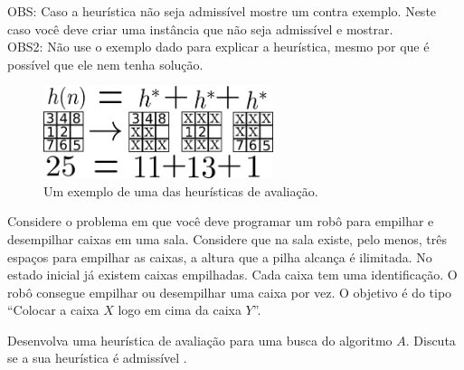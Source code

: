 \documentclass[12pt]{exam}
\begin{document}
\begin{questions}
OBS: Caso a heurística não seja admissível mostre um contra exemplo. Neste caso você deve criar uma instância que não seja admissível e mostrar.\\
OBS2: Não use o exemplo dado para explicar a heurística, mesmo por que é possível que ele nem tenha solução.



\begin{figure}[h]
    \centering
    \includegraphics[width=0.60\textwidth]{8p3heu}
    \caption{Um exemplo de uma das heurísticas de avaliação.}
    \label{fig:8p3heu}
\end{figure}


\question Considere o problema em que você deve programar um robô para empilhar e desempilhar caixas em uma sala. Considere que na sala existe, pelo menos, três espaços para empilhar as caixas, a altura que a pilha alcança é ilimitada. No estado inicial já existem caixas empilhadas. Cada caixa tem uma identificação. O robô consegue empilhar ou desempilhar uma caixa por vez. O objetivo é do tipo ``Colocar a caixa $X$ logo em cima da caixa $Y$''.

Desenvolva uma heurística de avaliação para uma busca do algoritmo $A$. Discuta se a sua heurística é admissível
.


\end{questions}
\end{document}
